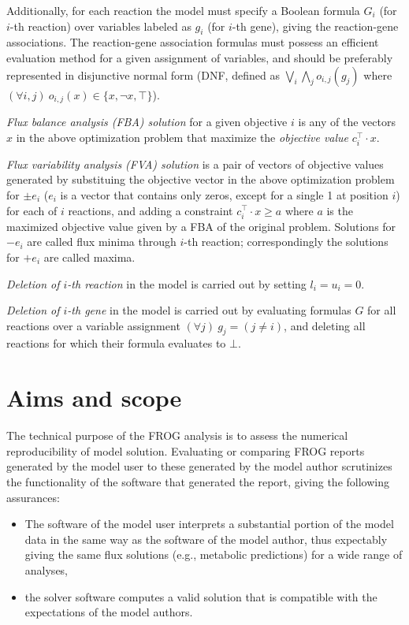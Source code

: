 Additionally, for each reaction the model must specify a Boolean formula $G_i$ (for $i$-th reaction) over variables labeled as $g_i$ (for $i$-th gene), giving the reaction-gene associations. The reaction-gene association formulas must possess an efficient evaluation method for a given assignment of variables, and should be preferably represented in disjunctive normal form (DNF, defined as $\bigvee_i\bigwedge_j o_{i,j}(g_j)$ where $(\forall i,j)\ o_{i,j}(x) \in \{x, \neg x, \top\}$).

\emph{Flux balance analysis (FBA) solution} for a given objective $i$ is any of the vectors $x$ in the above optimization problem that maximize the \emph{objective value} $c_i^\intercal \cdot x$.

\emph{Flux variability analysis (FVA) solution} is a pair of vectors of objective values generated by substituing the objective vector in the above optimization problem for $\pm e_i$ ($e_i$ is a vector that contains only zeros, except for a single 1 at position $i$) for each of $i$ reactions, and adding a constraint $c_i^\intercal\cdot x \geq a$ where $a$ is the maximized objective value given by a FBA of the original problem. Solutions for $-e_i$ are called flux minima through $i$-th reaction; correspondingly the solutions for $+e_i$ are called maxima.

\emph{Deletion of $i$-th reaction} in the model is carried out by setting $l_i = u_i = 0$.

\emph{Deletion of $i$-th gene} in the model is carried out by evaluating formulas $G$ for all reactions over a variable assignment $(\forall j)\ g_j = (j \neq i)$, and deleting all reactions for which their formula evaluates to $\bot$.~\cite{palsson2015systems}


\section{Aims and scope}

The technical purpose of the FROG analysis is to assess the numerical reproducibility of model solution. Evaluating or comparing FROG reports generated by the model user to these generated by the model author scrutinizes the functionality of the software that generated the report, giving the following assurances:
\begin{itemize}
\item The software of the model user interprets a substantial portion of the model data in the same way as the software of the model author, thus expectably giving the same flux solutions (e.g., metabolic predictions) for a wide range of analyses,
\item the solver software computes a valid solution that is compatible with the expectations of the model authors.
\end{itemize}

